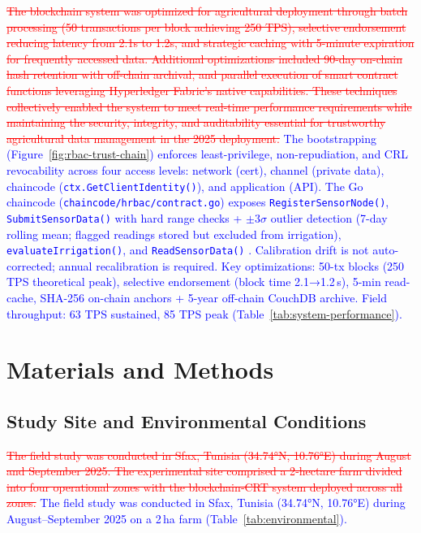 \documentclass[pdflatex,sn-mathphys-num]{sn-jnl}
\theoremstyle{thmstyleone}
\theoremstyle{thmstyletwo}
\theoremstyle{thmstylethree}
\begin{document}
{\textcolor{red}{\sout{The blockchain system was optimized for agricultural deployment through batch processing (50 transactions per block achieving 250 TPS), selective endorsement reducing latency from 2.1s to 1.2s, and strategic caching with 5-minute expiration for frequently accessed data. Additional optimizations included 90-day on-chain hash retention with off-chain archival, and parallel execution of smart contract functions leveraging Hyperledger Fabric's native capabilities. These techniques collectively enabled the system to meet real-time performance requirements while maintaining the security, integrity, and auditability essential for trustworthy agricultural data management in the 2025 deployment.}}
\textcolor{blue}{The bootstrapping (Figure~\ref{fig:rbac-trust-chain}) enforces least-privilege, non-repudiation, and CRL revocability across four access levels: network (cert), channel (private data), chaincode (\texttt{ctx.GetClientIdentity()}), and application (API). The Go chaincode (\texttt{chaincode/hrbac/contract.go}) exposes \texttt{RegisterSensorNode()}, \texttt{SubmitSensorData()} with hard range checks + $\pm3\sigma$ outlier detection (7-day rolling mean; flagged readings stored but excluded from irrigation), \texttt{evaluateIrrigation()}, and \texttt{ReadSensorData()} \cite{orderingServiceDoc,mdpiAccessControl}. Calibration drift is not auto-corrected; annual recalibration is required. Key optimizations: 50-tx blocks (250 TPS theoretical peak), selective endorsement (block time 2.1→1.2\,s), 5-min read-cache, SHA-256 on-chain anchors + 5-year off-chain CouchDB archive. Field throughput: 63 TPS sustained, 85 TPS peak (Table~\ref{tab:system-performance}).}

\section{Materials and Methods}
\label{sec:materials_methods}

\subsection{Study Site and Environmental Conditions}
\label{subsec:study_site}

\textcolor{red}{\sout{The field study was conducted in Sfax, Tunisia (34.74°N, 10.76°E) during August and September 2025. The experimental site comprised a 2‑hectare farm divided into four operational zones with the blockchain‑CRT system deployed across all zones.}}
\textcolor{blue}{The field study was conducted in Sfax, Tunisia (34.74°N, 10.76°E) during August–September 2025 on a 2\,ha farm (Table~\ref{tab:environmental}).}

}
\end{document}
